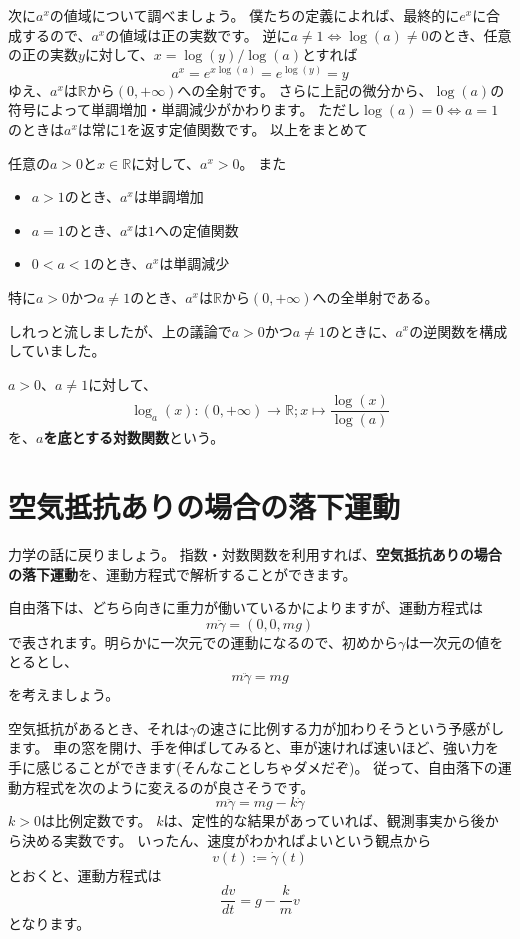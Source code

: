 次に$a^x$の値域について調べましょう。
僕たちの定義によれば、最終的に$e^x$に合成するので、$a^x$の値域は正の実数です。
逆に$a\neq1\iff\log(a)\neq0$のとき、任意の正の実数$y$に対して、$x=\log(y)/\log(a)$とすれば
\[
  a^x=e^{x\log(a)}=e^{\log(y)}=y
\]
ゆえ、$a^x$は$\mathbb{R}$から$(0,+\infty)$への全射です。
さらに上記の微分から、$\log(a)$の符号によって単調増加・単調減少がかわります。
ただし$\log(a)=0 \iff a=1$のときは$a^x$は常に1を返す定値関数です。
以上をまとめて
\begin{theorem}
  任意の$a>0$と$x\in\mathbb{R}$に対して、$a^x>0$。
  また
  \begin{itemize}
    \item $a>1$のとき、$a^x$は単調増加
    \item $a=1$のとき、$a^x$は$1$への定値関数
    \item $0<a<1$のとき、$a^x$は単調減少
  \end{itemize}
  特に$a>0$かつ$a\neq1$のとき、$a^x$は$\mathbb{R}$から$(0,+\infty)$への全単射である。
\end{theorem}

しれっと流しましたが、上の議論で$a>0$かつ$a\neq1$のときに、$a^x$の逆関数を構成していました。
\begin{definition}
  $a>0$、$a\neq1$に対して、
  \[
    \log_a(x):(0,+\infty)\to\mathbb{R};x\mapsto\frac{\log(x)}{\log(a)}
  \]
  を、\textbf{$a$を底とする対数関数}という。
\end{definition}



\section{空気抵抗ありの場合の落下運動}

力学の話に戻りましょう。
指数・対数関数を利用すれば、\textbf{空気抵抗ありの場合の落下運動}を、運動方程式で解析することができます。

自由落下は、どちら向きに重力が働いているかによりますが、運動方程式は
\[
  m\ddot{\gamma}=(0,0,mg)
\]
で表されます。明らかに一次元での運動になるので、初めから$\gamma$は一次元の値をとるとし、
\[
  m\ddot{\gamma}=mg
\]
を考えましょう。

空気抵抗があるとき、それは$\gamma$の速さに比例する力が加わりそうという予感がします。
車の窓を開け、手を伸ばしてみると、車が速ければ速いほど、強い力を手に感じることができます(そんなことしちゃダメだぞ)。
従って、自由落下の運動方程式を次のように変えるのが良さそうです。
\[
  m\ddot{\gamma}=mg-k\dot{\gamma}
\]
$k>0$は比例定数です。
$k$は、定性的な結果があっていれば、観測事実から後から決める実数です。
いったん、速度がわかればよいという観点から
\[
  v(t):=\dot{\gamma}(t)
\]
とおくと、運動方程式は
\[
  \frac{dv}{dt}=g-\frac{k}{m}v
\]
となります。

